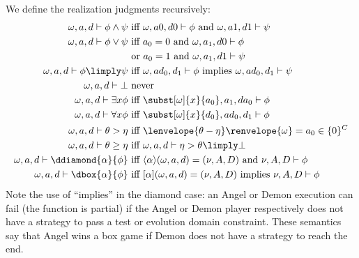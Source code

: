 \documentclass[12pt]{cmuthesis}
\theoremstyle{definition}
\theoremstyle{remark}
\newcommand{\tint}[2]{\lenvelope{#1}\renvelope{#2}}
\begin{document}
We define the realization judgments recursively:
\begin{align*}
\rzF{\sa,\aa,\da}{\phi \land \psi}        &\text{ iff }\rzF{\sa,\aa 0,\da 0}{\phi}\text{ and }\rzF{\sa,\aa 1,\da 1}{\psi}\\
\rzF{\sa,\aa,\da}{\phi \lor \psi}         &\text{ iff }\rzFst{\aa}=0\text{ and }\rzF{\sa,\rzSnd{\aa},\da 0}{\phi}\\
                                          &\text{ or }\rzFst{\aa}=1\text{ and }\rzF{\sa,\rzSnd{\aa},\da 1}{\psi}\\
\rzF{\sa,\aa,\da}{\phi \limply \psi}      &\text{ iff }\rzF{\sa,\rzApp{\aa}{\rzFst{\da}},\rzSnd{\da}}{\phi}\text{ implies }\rzF{\sa,\rzApp{\aa}{\rzFst{\da}},\rzSnd{\da}}{\psi}\\
\rzF{\sa,\aa,\da}{\bot}                   &\text{ never}\\
\rzF{\sa,\aa,\da}{\exists{x}{\phi}}       &\text{ iff }\rzF{\subst[\sa]{x}{\rzFst{\aa}},\rzSnd{\aa},\rzApp{\da}{\rzFst{\aa}}}{\phi}\\
\rzF{\sa,\aa,\da}{\forall{x}{\phi}}       &\text{ iff }\rzF{\subst[\sa]{x}{\rzFst{\da}},\rzApp{\aa}{\rzFst{\da}},\rzSnd{\da}}{\phi}\\
\rzF{\sa,\aa,\da}{\theta > \eta}          &\text{ iff }\tint{\theta - \eta}{\sa} = \rzFst{\aa} \in \{0\}^C\\
\rzF{\sa,\aa,\da}{\theta \geq \eta}       &\text{ iff }\rzF{\sa,\aa,\da}{\eta > \theta \limply \bot}\\
\rzF{\sa,\aa,\da}{\ddiamond{\alpha}{\phi}}&\text{ iff } \rzA{\sa,\aa,\da}{\alpha}{\sb,\ab,\db}\text{ and }\rzF{\sb,\ab,\db}{\phi}\\
\rzF{\sa,\aa,\da}{\dbox{\alpha}{\phi}}    &\text{ iff } \rzD{\sa,\aa,\da}{\alpha}{\sb,\ab,\db}\text{ implies }\rzF{\sb,\ab,\db}{\phi}
\end{align*}
Note the use of ``implies'' in the diamond case: an Angel or Demon execution can fail (the function is partial) if the Angel or Demon player respectively does not have a strategy to pass a test or evolution domain constraint.
These semantics say that Angel wins a box game if Demon does not have a strategy to reach the end.
\end{document}
